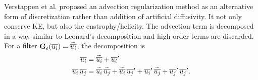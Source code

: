 Verstappen et al. \cite{verstappen2008} proposed an advection regularization method as an alternative form of discretization rather than addition of artificial diffusivity. It not only conserve KE, but also the enstrophy/helicity. The advection term is decomposed in a way similar to Leonard's decomposition \cite{leonard1975} and high-order terms are discarded. For a filter $\mathbf{G_{\epsilon}}(\overline{u_i}) = \widetilde{\overline{u_i}}$, the decomposition is
\begin{align}
\begin{split}
\overline{u_i} & = \widetilde{\overline{u_i}} + {\overline{u_i}}^{\prime}
\\
\overline{u_i} \, \overline{u_j} & = 
 \widetilde{\overline{u_i}} \, \widetilde{\overline{u_j}} 
 + \widetilde{\overline{u_i}} \, {\overline{u_j}}^{\prime}
 + {\overline{u_i}}^{\prime} \, \widetilde{\overline{u_j}}
 + {\overline{u_j}}^{\prime} \, {\overline{u_j}}^{\prime}.
\end{split}
\end{align}

